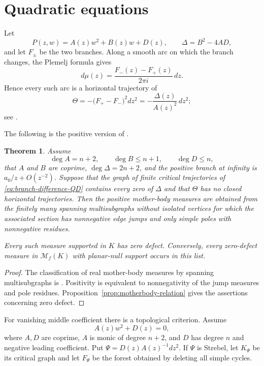 \documentclass[10pt,a4paper]{amsart}
\newtheorem{theorem}{Theorem}[section]
\newcommand{\M}{\mathcal M}
\begin{document}
\section{Quadratic equations}\label{sec:quadratic}

Let
\[
 P(z,w)=A(z)w^2+B(z)w+D(z),
 \qquad \Delta=B^2-4AD,
\]
and let $F_\pm$ be the two branches.  Along a smooth arc on which the branch
changes, the Plemelj formula gives
\[
 d\mu(z)=\frac{F_-(z)-F_+(z)}{2\pi i}\,dz.
\]
Hence every such arc is a horizontal trajectory of
\begin{equation}\label{eq:branch-difference-QD}
 \Theta=-\bigl(F_+-F_-\bigr)^2dz^2
       =-\frac{\Delta(z)}{A(z)^2}\,dz^2;
\end{equation}
see \cite[Proposition~9]{BoSh}.

The following is the positive version of \cite[Theorem~12]{BoSh}.

\begin{theorem}\label{thm:quadratic-finite}
Assume
\[
 \deg A=n+2,\qquad \deg B\le n+1,\qquad \deg D\le n,
\]
that $A$ and $B$ are coprime, $\deg\Delta=2n+2$, and the positive branch at
infinity is $a_0/z+O(z^{-2})$.  Suppose that the graph of finite critical
trajectories of \eqref{eq:branch-difference-QD} contains every zero of $\Delta$
and that $\Theta$ has no closed horizontal trajectories.  Then the positive
mother-body measures are obtained from the finitely many spanning
multisubgraphs without isolated vertices for which the associated section has
nonnegative edge jumps and only simple poles with nonnegative residues.

Every such measure supported in $K$ has zero defect.  Conversely, every
zero-defect measure in $\M_f(K)$ with planar-null support occurs in this list.
\end{theorem}

\begin{proof}
The classification of real mother-body measures by spanning multisubgraphs is
\cite[Theorem~12]{BoSh}.  Positivity is equivalent to nonnegativity of the jump
measures and pole residues.  Proposition~\ref{prop:motherbody-relation} gives
the assertions concerning zero defect.
\end{proof}

For vanishing middle coefficient there is a topological criterion.  Assume
\[
 A(z)w^2+D(z)=0,
\]
where $A,D$ are coprime, $A$ is monic of degree $n+2$, and $D$ has degree $n$
and negative leading coefficient.  Put
$\Psi=D(z)A(z)^{-1}dz^2$.  If $\Psi$ is Strebel, let $K_\Psi$ be its critical
graph and let $F_\Psi$ be the forest obtained by deleting all simple cycles.
\end{document}
